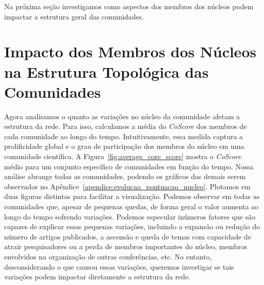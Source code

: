 
Na próxima seção investigamos como aspectos dos membros dos núcleos podem impactar a estrutura geral das comunidades.


\section{Impacto dos Membros dos Núcleos na Estrutura Topológica das Comunidades}\label{sub:corr}

Agora analisamos o quanto as variações no núcleo da comunidade afetam a estrutura da rede. Para isso, calculamos 
a média do \textit{CoScore} dos membros de cada comunidade ao longo do tempo. Intuitivamente, essa medida captura a 
prolificidade global e o grau de participação dos membros do núcleo em uma comunidade científica. A Figura~\ref{fig:average_core_score} 
mostra o \textit{CoScore} médio para um conjunto específico de comunidades em função do tempo. Nossa análise abrange todas as comunidades, podendo os gráficos das demais 
serem observados no Apêndice~\ref{apendice:evolucao_pontuacao_nucleo}. Plotamos em duas figuras distintas para 
facilitar a visualização. Podemos observar em todas as comunidades que, apesar de pequenas quedas, de forma geral o valor aumenta 
ao longo do tempo sofrendo variações. Podemos especular inúmeros fatores que são capazes de explicar essas pequenas variações, incluindo a expansão 
ou redução do número de artigos publicados, a ascensão e queda de temas com capacidade de atrair pesquisadores ou a perda de 
membros importantes do núcleo, membros envolvidos na organização de outras conferências, etc. No entanto, desconsiderando o que 
causou essas variações, queremos investigar se tais variações podem impactar diretamente a estrutura da rede.

